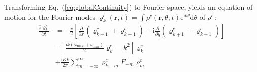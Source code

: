 \documentclass{article}
\begin{document}
Transforming Eq.~(\ref{eq:globalContinuity}) to Fourier space, yields an equation of motion for the Fourier modes $\varrho _{k}^{c}\left( \mathbf{r},t \right) =\int{\rho ^c\left( \mathbf{r},\theta ,t \right) \text{e}^{\text{i}k\theta}\text{d}\theta}$ of $\rho^c$:
\begin{equation}
    \begin{aligned}
        \frac{\partial \varrho _{k}^{c}}{\partial t}&=-\frac{v}{2}\left[ \frac{\partial}{\partial x}\left( \varrho _{k+1}^{c}+\varrho _{k-1}^{c} \right) -\mathrm{i}\frac{\partial}{\partial y}\left( \varrho _{k+1}^{c}-\varrho _{k-1}^{c} \right) \right]\\
        &-\left[ \frac{\mathrm{i}k\left( \omega _{\max}+\omega _{\min} \right)}{2}\varrho _{k}^{c}-k^2 \right] \varrho _{k}^{c}\\
        &+\frac{\mathrm{i}Kk}{2\pi}\sum_{m=-\infty}^{\infty}{\varrho _{k-m}^{c}F_{-m}\varrho _{m}^{c}}\\
    \end{aligned}
\end{equation}
\end{document}
